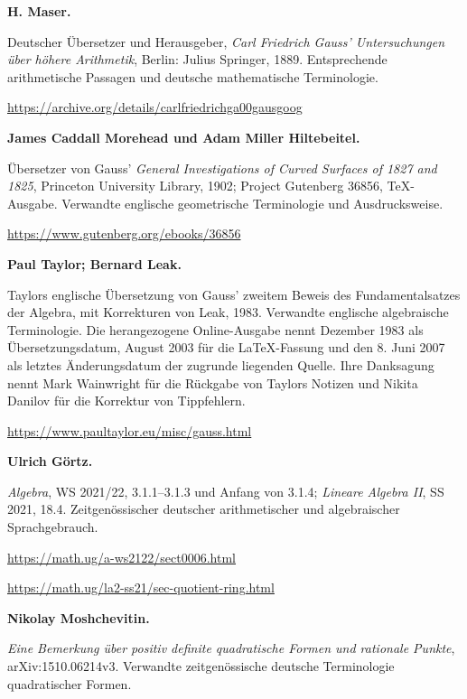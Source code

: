 \par\medskip\noindent\textbf{H. Maser.}\par\nobreak\smallskip\noindent Deutscher Übersetzer und Herausgeber, \emph{Carl Friedrich Gauss' Untersuchungen über höhere Arithmetik}, Berlin: Julius Springer, 1889. Entsprechende arithmetische Passagen und deutsche mathematische Terminologie.\par
\url{https://archive.org/details/carlfriedrichga00gausgoog}
\par\medskip\noindent\textbf{James Caddall Morehead und Adam Miller Hiltebeitel.}\par\nobreak\smallskip\noindent Übersetzer von Gauss' \emph{General Investigations of Curved Surfaces of 1827 and 1825}, Princeton University Library, 1902; Project Gutenberg 36856, TeX-Ausgabe. Verwandte englische geometrische Terminologie und Ausdrucksweise.\par
\url{https://www.gutenberg.org/ebooks/36856}
\par\medskip\noindent\textbf{Paul Taylor; Bernard Leak.}\par\nobreak\smallskip\noindent Taylors englische Übersetzung von Gauss' zweitem Beweis des Fundamentalsatzes der Algebra, mit Korrekturen von Leak, 1983. Verwandte englische algebraische Terminologie. Die herangezogene Online-Ausgabe nennt Dezember 1983 als Übersetzungsdatum, August 2003 für die LaTeX-Fassung und den 8. Juni 2007 als letztes Änderungsdatum der zugrunde liegenden Quelle. Ihre Danksagung nennt Mark Wainwright für die Rückgabe von Taylors Notizen und Nikita Danilov für die Korrektur von Tippfehlern.\par
\url{https://www.paultaylor.eu/misc/gauss.html}
\par\medskip\noindent\textbf{Ulrich Görtz.}\par\nobreak\smallskip\noindent \emph{Algebra}, WS 2021/22, 3.1.1–3.1.3 und Anfang von 3.1.4; \emph{Lineare Algebra II}, SS 2021, 18.4. Zeitgenössischer deutscher arithmetischer und algebraischer Sprachgebrauch.\par
\url{https://math.ug/a-ws2122/sect0006.html}\par
\url{https://math.ug/la2-ss21/sec-quotient-ring.html}
\par\medskip\noindent\textbf{Nikolay Moshchevitin.}\par\nobreak\smallskip\noindent \emph{Eine Bemerkung über positiv definite quadratische Formen und rationale Punkte}, arXiv:1510.06214v3. Verwandte zeitgenössische deutsche Terminologie quadratischer Formen.\par
